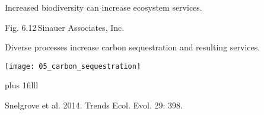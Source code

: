 \documentclass[t]{beamer}
\begin{document}
%
{
\begin{frame}[b]{Increased biodiversity can increase ecosystem services.}


\hfill\tiny Fig. 6.12\,\textcopyright Sinauer Associates, Inc.
\end{frame}
}
%
\begin{frame}[t]{Diverse processes increase carbon sequestration and resulting services.}

		\texttt{[image: 05\_carbon\_sequestration]}
		
	\vskip0pt plus 1filll
	
	\hfill\tiny Snelgrove et al. 2014. Trends Ecol. Evol.  29: 398.

\end{frame}
\end{document}
